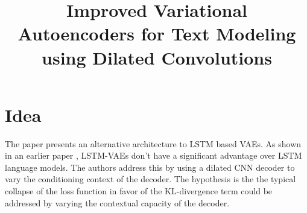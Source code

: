 \documentclass[12pt]{article}
\begin{document}
\title{Improved Variational Autoencoders for Text Modeling using Dilated Convolutions}
\author{}
\date{}
\maketitle

\section{Idea}
  The paper presents an alternative architecture to LSTM based VAEs. As shown in an earlier paper \cite{bowman2015generating}, LSTM-VAEs don't have a significant advantage over LSTM language models. The authors address this by using a dilated CNN decoder to vary the conditioning context of the decoder. The hypothesis is the the typical collapse of the loss function in favor of the KL-divergence term could be addressed by varying the contextual capacity of the decoder.
\end{document}
